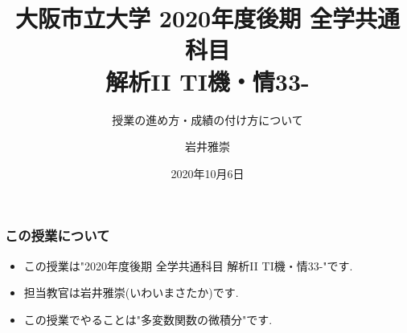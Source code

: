 \documentclass[11pt,dvipdfmx]{beamer}
\title[大阪市立大学 2020年度後期 全学共通科目 解析II TI機・情33-]{大阪市立大学 2020年度後期 全学共通科目 \\ 解析II TI機・情33-}
\subtitle{授業の進め方・成績の付け方について}
\author[岩井雅崇]{岩井雅崇}
\institute[大阪市立大学数学研究所]{大阪市立大学数学研究所}
\date{2020年10月6日}  %
\theoremstyle{definition}
\theoremstyle{remark}
\begin{document}

\begin{frame}  %
 \titlepage    %
\end{frame}





\section{ }
\begin{frame}
\frametitle{この授業について}
 \begin{itemize}


 \item この授業は"2020年度後期 全学共通科目 解析II TI機・情33-"です.
 \item 担当教官は岩井雅崇(いわいまさたか)です.
 \item この授業でやることは"多変数関数の微積分"です.
 
 \end{itemize}
\end{frame}
\end{document}
